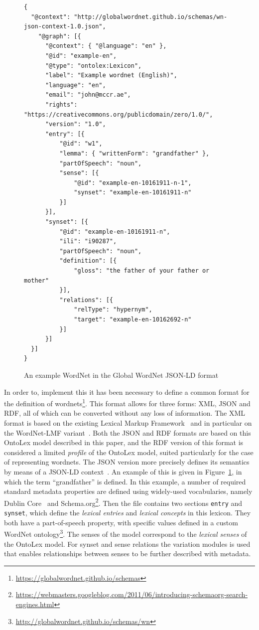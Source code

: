 \documentclass[12pt,a4paper]{elex2017}
\begin{document}
\begin{figure}
    \footnotesize
    \begin{verbatim}
{ 
  "@context": "http://globalwordnet.github.io/schemas/wn-json-context-1.0.json",
    "@graph": [{
      "@context": { "@language": "en" },
      "@id": "example-en",
      "@type": "ontolex:Lexicon", 
      "label": "Example wordnet (English)",
      "language": "en",
      "email": "john@mccr.ae",
      "rights": "https://creativecommons.org/publicdomain/zero/1.0/",
      "version": "1.0",
      "entry": [{
          "@id": "w1",
          "lemma": { "writtenForm": "grandfather" },
          "partOfSpeech": "noun",
          "sense": [{
              "@id": "example-en-10161911-n-1",
              "synset": "example-en-10161911-n"
          }]
      }],
      "synset": [{
          "@id": "example-en-10161911-n",
          "ili": "i90287",
          "partOfSpeech": "noun",
          "definition": [{
              "gloss": "the father of your father or mother"
          }],
          "relations": [{
              "relType": "hypernym",
              "target": "example-en-10162692-n"
          }]
      }]
  }]
}
    \end{verbatim}
    \caption{\label{fig:json-example}An example WordNet in the Global WordNet
    JSON-LD format}
\end{figure}



In order to, implement this it has been necessary to define a common format for
the definition of
wordnets\footnote{\url{https://globalwordnet.github.io/schemas}}. This format
allows for three forms: XML, JSON and RDF, all of which can be converted without
any loss of information. The XML format is based on the existing Lexical Markup
Framework~\citep{francopoulo2006lexical} and in particular on the WordNet-LMF
variant~\cite{soria2009wordnet}. Both the JSON and RDF formats are based on this
OntoLex model described in this paper, and the RDF version of this format is
considered a limited \emph{profile} of the OntoLex model, suited particularly
for the case of representing wordnets. The JSON version more precisely defines
its semantics by means of a JSON-LD context~\citep{sporny2014json}. An example
of this is given in Figure~\ref{fig:json-example}, in which the term
``grandfather'' is defined. In this example, a number of required standard
metadata properties are defined using widely-used vocabularies, namely Dublin
Core~\citep{rfc2413} and
Schema.org\footnote{\url{https://webmasters.googleblog.com/2011/06/introducing-schemaorg-search-engines.html}}.
Then the file contains two sections \texttt{entry} and \texttt{synset}, which
define the \emph{lexical entries} and \emph{lexical concepts} in this lexicon.
They both have a part-of-speech property, with specific values defined in a
custom WordNet
ontology\footnote{\url{http://globalwordnet.github.io/schemas/wn}}. The senses
of the model correspond to the \emph{lexical senses} of the OntoLex
model. For synset and sense relations the variation modules is used that enables
relationships between senses to be further described with metadata.
\end{document}
